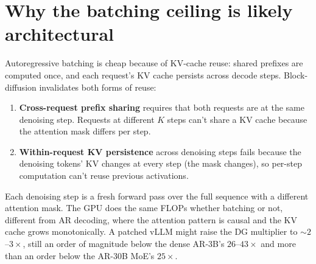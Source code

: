 \section{Why the batching ceiling is likely architectural}
\label{app:batching_architectural}

Autoregressive batching is cheap because of KV-cache reuse: shared
prefixes are computed once, and each request's KV cache persists across
decode steps. Block-diffusion invalidates both forms of reuse:
\begin{enumerate}[nosep]
\item \textbf{Cross-request prefix sharing} requires that both requests
are at the same denoising step. Requests at different $K$ steps can't
share a KV cache because the attention mask differs per step.
\item \textbf{Within-request KV persistence} across denoising steps
fails because the denoising tokens' KV changes at every step (the mask
changes), so per-step computation can't reuse previous activations.
\end{enumerate}
Each denoising step is a fresh forward pass over the full sequence with
a different attention mask. The GPU does the same FLOPs whether batching
or not, different from AR decoding, where the attention
pattern is causal and the KV cache grows monotonically. A patched vLLM
might raise the DG multiplier to $\sim 2$--$3\times$, still an order of
magnitude below the dense AR-3B's $26$--$43\times$ and more than an
order below the AR-30B MoE's $25\times$.
